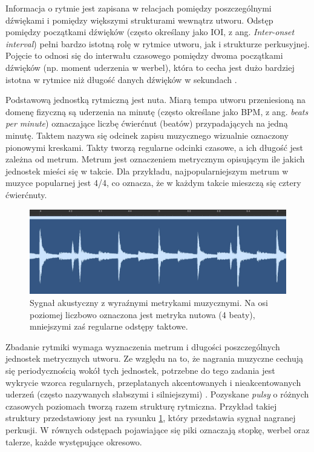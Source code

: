 \documentclass[12pt,a4paper,twoside]{mwart}
\begin{document}
Informacja o rytmie jest zapisana w relacjach pomiędzy poszczególnymi dźwiękami i pomiędzy większymi strukturami wewnątrz utworu. Odstęp pomiędzy początkami dźwięków (często określany jako IOI, z ang. \textit{Inter-onset interval}) pełni bardzo istotną rolę w rytmice utworu, jak i strukturze perkusyjnej. Pojęcie to odnosi się do interwału czasowego pomiędzy dwoma początkami dźwięków (np. moment uderzenia w werbel), która to cecha jest dużo bardziej istotna w rytmice niż długość danych dźwięków w sekundach
\cite[482-489]{Transcription:Clarke:RhythmAndTiming}.

Podstawową jednostką rytmiczną jest nuta. Miarą tempa utworu przeniesioną na domenę fizyczną są uderzenia na minutę (często określane jako BPM, z ang. \textit{beats per minute}) oznaczające liczbę ćwierćnut (beatów) przypadających na jedną minutę. Taktem nazywa się odcinek zapisu muzycznego wizualnie oznaczony pionowymi kreskami. Takty tworzą regularne odcinki czasowe, a ich długość jest zależna od metrum. Metrum jest oznaczeniem metrycznym opisującym ile jakich jednostek mieści się w takcie. Dla przykładu, najpopularniejszym metrum w muzyce popularnej jest 4/4, co oznacza, że w każdym takcie mieszczą się cztery ćwierćnuty.

\begin{figure}[H]
  \begin{center}
    \includegraphics[scale=0.3]{images/RythmMertic.jpg}
    \caption{Sygnał akustyczny z wyraźnymi metrykami muzycznymi. Na osi poziomej liczbowo oznaczona jest metryka nutowa (4 beaty), mniejszymi zaś regularne odstępy taktowe.}
    \label{fig:rythmMertic}
  \end{center}
\end{figure}

Zbadanie rytmiki wymaga wyznaczenia metrum i długości poszczególnych jednostek metrycznych utworu. Ze względu na to, że nagrania muzyczne cechują się periodycznością wokół tych jednostek, potrzebne do tego zadania jest wykrycie wzorca regularnych, przeplatanych akcentowanych i nieakcentowanych uderzeń (często nazywanych słabszymi i silniejszymi) 
\cite[12-35]{Transcription:Lerdahl:GenerativeTheory}.
Pozyskane \textit{pulsy} o różnych czasowych poziomach tworzą razem strukturę rytmiczna. Przykład takiej struktury przedstawiony jest na rysunku \ref{fig:rythmMertic}, który przedstawia sygnał nagranej perkusji. W równych odstępach pojawiające się piki oznaczają stopkę, werbel oraz talerze, każde występujące okresowo.
\end{document}
